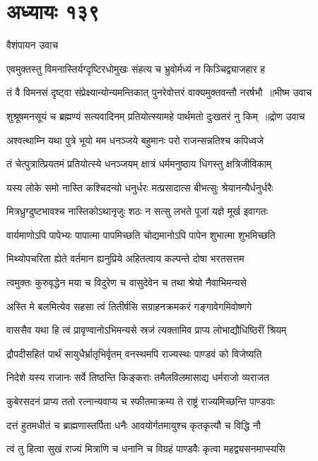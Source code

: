 \chapter{अध्यायः १३९}
\twolineshloka
{वैशंपायन उवाच}
{}


\twolineshloka
{एवमुक्तस्तु विमनास्तिर्यग्दृष्टिरधोमुखः}
{संहत्य च भ्रुवोर्मध्यं न किञ्चिद्व्याजहार ह}


\threelineshloka
{तं वै विमनसं दृष्ट्वा संप्रेक्ष्यान्योन्यमन्तिकात्}
{पुनरेवोत्तरं वाक्यमुक्तवन्तौ नरर्षभौ ॥भीष्म उवाच}
{}


\threelineshloka
{शुश्रूषमनसूयं च ब्रह्मण्यं सत्यवादिनम्}
{प्रतियोत्स्यामहे पार्थमतो दुःखतरं नु किम् ॥द्रोण उवाच}
{}


\twolineshloka
{अश्वत्थाम्नि यथा पुत्रे भूयो मम धनञ्जये}
{बहुमानः परो राजन्सन्नतिश्च कपिध्वजे}


\twolineshloka
{तं चेत्पुत्रात्प्रियतमं प्रतियोत्स्ये धनञ्जयम्}
{क्षात्रं धर्ममनुष्ठाय धिगस्तु क्षत्रिजीविकाम्}


\twolineshloka
{यस्य लोके समो नास्ति कश्चिदन्यो धनुर्धरः}
{मत्प्रसादात्स बीभत्सुः श्रेयानन्यैर्धनुर्धरैः}


\twolineshloka
{मित्रध्रुग्दुष्टभावश्च नास्तिकोऽथानृजुः शठः}
{न सत्सु लभते पूजां यज्ञे मूर्ख इवागतः}


\twolineshloka
{वार्यमाणोऽपि पापेभ्यः पापात्मा पापमिच्छति}
{चोद्यमानोऽपि पापेन शुभात्मा शुभमिच्छति}


\twolineshloka
{मिथ्योपचरिता ह्येते वर्तमान ह्यनुप्रिये}
{अहितत्वाय कल्पन्ते दोषा भरतसत्तम}


\twolineshloka
{त्वमुक्तः कुरुवृद्धेन मया च विदुरेण च}
{वासुदेवेन च तथा श्रेयो नैवाभिमन्यसे}


\twolineshloka
{अस्ति मे बलमित्येव सहसा त्वं तितीर्षसि}
{सग्राहनक्रमकरं गङ्गावेगमिवोष्णगे}


\twolineshloka
{वाससैव यथा हि त्वं प्रावृण्वानोऽभिमन्यसे}
{स्रजं त्यक्तामिव प्राप्य लोभाद्यौधिष्ठिरीं श्रियम्}


\twolineshloka
{द्रौपदीसहितं पार्थं सायुधैर्भ्रातृभिर्वृतम्}
{वनस्थमपि राज्यस्थः पाण्डवं को विजेष्यति}


\twolineshloka
{निदेशे यस्य राजानः सर्वे तिष्ठन्ति किङ्कराः}
{तमैलविलमासाद्य धर्मराजो व्यराजत}


\twolineshloka
{कुबेरसदनं प्राप्य ततो रत्नान्यवाप्य च}
{स्फीतमाक्रम्य ते राष्ट्रं राज्यमिच्छन्ति पाण्डवाः}


\twolineshloka
{दत्तं हुतमधीतं च ब्राह्मणास्तर्पिता धनैः}
{आवयोर्गतमायुश्च कृतकृत्यौ च विद्धि नौ}


\twolineshloka
{त्वं तु हित्वा सुखं राज्यं मित्राणि च धनानि च}
{विग्रहं पाण्डवैः कृत्वा महद्व्यसनमाप्स्यसि}


